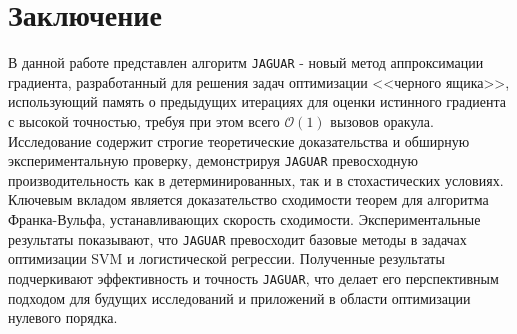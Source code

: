 \section{Заключение}

    В данной работе представлен алгоритм \texttt{JAGUAR} - новый метод аппроксимации градиента, разработанный для решения задач оптимизации <<черного ящика>>, использующий память о предыдущих итерациях для оценки истинного градиента с высокой точностью, требуя при этом всего $\mathcal{O} (1)$ вызовов оракула. Исследование содержит строгие теоретические доказательства и обширную экспериментальную проверку, демонстрируя \texttt{JAGUAR} превосходную производительность как в детерминированных, так и в стохастических условиях. Ключевым вкладом является доказательство сходимости теорем для алгоритма Франка-Вульфа, устанавливающих скорость сходимости. Экспериментальные результаты показывают, что \texttt{JAGUAR} превосходит базовые методы в задачах оптимизации SVM и логистической регрессии. Полученные результаты подчеркивают эффективность и точность \texttt{JAGUAR}, что делает его перспективным подходом для будущих исследований и приложений в области оптимизации нулевого порядка.